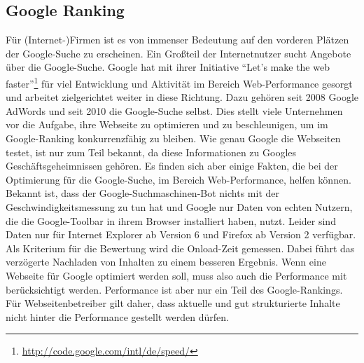 \subsection{Google Ranking}
Für (Internet-)Firmen ist es von immenser Bedeutung auf den vorderen Pl\"atzen der Google-Suche zu erscheinen. Ein Großteil der Internetnutzer sucht Angebote über die Google-Suche.\citep{Hitwise2011}
Google hat mit ihrer Initiative "`Let's make the web faster"'\footnote{\url{http://code.google.com/intl/de/speed/}} für viel Entwicklung und Aktivität im Bereich Web-Performance gesorgt und arbeitet zielgerichtet weiter in diese Richtung.\citep{Google2011} Dazu gehören seit 2008 Google AdWords\citep{AdWords2008} und seit 2010 die Google-Suche selbst. Dies stellt viele Unternehmen vor die Aufgabe, ihre Webseite zu optimieren und zu beschleunigen, um im Google-Ranking konkurrenzfähig zu bleiben. Wie genau Google die Webseiten testet, ist nur zum Teil bekannt, da diese Informationen zu Googles Geschäftsgeheimnissen gehören. Es finden sich aber einige Fakten, die bei der Optimierung für die Google-Suche, im Bereich Web-Performance, helfen können.
Bekannt ist, dass der Google-Suchmaschinen-Bot nichts mit der Geschwindigkeitsmessung zu tun hat und Google nur Daten von echten Nutzern, die die Google-Toolbar in ihrem Browser installiert haben, nutzt. Leider sind Daten nur für Internet Explorer ab Version 6 und Firefox ab Version 2 verfügbar. Als Kriterium für die Bewertung wird die Onload-Zeit gemessen. Dabei führt das verzögerte Nachladen von Inhalten zu einem besseren Ergebnis. Wenn eine Webseite für Google optimiert werden soll, muss also auch die Performance mit berücksichtigt werden. Performance ist aber nur ein Teil des Google-Rankings. Für Webseitenbetreiber gilt daher, dass aktuelle und gut strukturierte Inhalte nicht hinter die Performance gestellt werden dürfen.\citep{Bixby2011}

